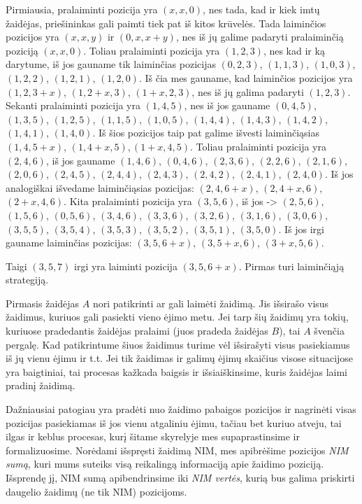 \begin{sprendimas}
Pirmiausia, pralaiminti pozicija yra $(x, x, 0)$, nes tada, kad ir kiek imtų
žaidėjas, priešininkas gali paimti tiek pat iš kitos krūvelės. Tada laiminčios
pozicijos yra $(x, x, y)$ ir $(0, x, x+y)$, nes iš jų galime padaryti
pralaiminčią poziciją $(x, x, 0)$. Toliau pralaiminti pozicija yra $(1, 2, 3)$,
nes kad ir ką darytume, iš jos gauname tik laiminčias pozicijas $(0, 2,
3)$, $(1, 1, 3)$, $(1, 0, 3)$, $(1, 2, 2)$, $(1, 2, 1)$, $(1, 2, 0)$. Iš čia mes gauname,
kad laiminčios pozicijos yra $(1, 2, 3+x)$, $(1, 2+x, 3)$, $(1+x, 2, 3)$, nes iš
jų galima padaryti $(1, 2, 3)$. Sekanti pralaiminti pozicija yra $(1, 4, 5)$,
nes iš jos gauname $(0, 4, 5)$, $(1, 3, 5)$, $(1, 2, 5)$, $(1, 1, 5)$, $(1, 0,
5)$, $(1, 4, 4)$, $(1, 4, 3)$, $(1, 4, 2)$, $(1, 4, 1)$, $(1, 4, 0)$. Iš šios
pozicijos taip pat galime išvesti laiminčiąsias $(1, 4, 5+x)$, $(1, 4+x, 5),
(1+x, 4, 5)$. Toliau pralaiminti pozicija yra $(2, 4, 6)$, iš jos gauname $(1,
4, 6)$, $(0, 4, 6)$, $(2, 3, 6)$, $(2, 2, 6)$, $(2, 1, 6)$, $(2, 0, 6)$, $(2,
4, 5)$, $(2, 4, 4)$, $(2, 4, 3)$, $(2, 4, 2)$, $(2, 4, 1)$, $(2, 4, 0)$.  Iš jos
analogiškai išvedame laiminčiąsias pozicijas: $(2, 4, 6+x)$, $(2, 4+x, 6)$,
$(2+x, 4, 6)$. Kita pralaiminti pozicija yra $(3, 5, 6)$, iš jos -> $(2, 5,
6)$, $(1, 5, 6)$, $(0, 5, 6)$, $(3, 4, 6)$, $(3, 3, 6)$, $(3, 2, 6)$, $(3, 1,
6)$, $(3, 0, 6)$, $(3, 5, 5)$, $(3, 5, 4)$, $(3, 5, 3)$, $(3, 5, 2)$, $(3,
5, 1)$, $( 3, 5, 0)$. Iš jos irgi gauname laiminčias pozicijas: $(3, 5,
6+x)$, $(3, 5+x, 6)$, $(3+x, 5, 6)$.

Taigi $(3, 5, 7)$ irgi yra laiminti pozicija $(3, 5, 6+x)$.  Pirmas turi
laiminčiąją strategiją. 
\end{sprendimas}

Pirmasis žaidėjas $A$ nori patikrinti ar gali laimėti žaidimą. Jis išsirašo
visus žaidimus, kuriuos gali pasiekti vieno ėjimo metu. Jei tarp šių
žaidimų yra tokių, kuriuose pradedantis žaidėjas pralaimi (juos pradeda
žaidėjas $B$), tai $A$ švenčia pergalę. Kad patikrintume šiuos žaidimus
turime vėl išsirašyti visus pasiekiamus iš jų vienu ėjimu ir t.t. Jei tik
žaidimas ir galimų ėjimų skaičius visose situacijose yra baigtiniai, tai
procesas kažkada baigsis ir išsiaiškinsime, kuris žaidėjas laimi pradinį
žaidimą. 

Dažniausiai patogiau yra pradėti nuo žaidimo pabaigos pozicijos ir
nagrinėti visas pozicijas pasiekiamas iš jos vienu atgaliniu ėjimu, tačiau
bet kuriuo atveju, tai ilgas ir keblus procesas, kurį šitame skyrelyje mes
supaprastinsime ir formalizuosime. Norėdami išspręsti žaidimą NIM, mes
apibrėšime pozicijos \emph{NIM sumą}, kuri mums suteiks visą reikalingą
informaciją apie žaidimo poziciją. Išsprendę jį, NIM sumą apibendrinsime
iki \emph{NIM vertės}, kurią bus galima priskirti daugelio žaidimų (ne tik
NIM) pozicijoms.

